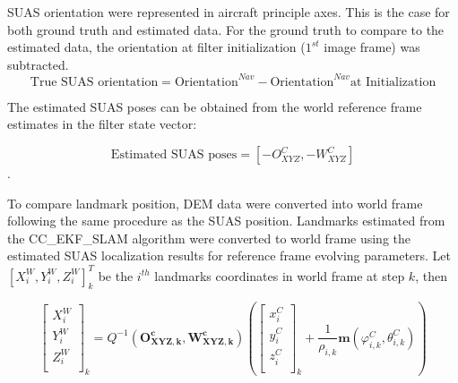 SUAS orientation were represented in aircraft principle axes. This is
the case for both ground truth and estimated data. For the ground
truth to compare to the estimated data, the orientation at filter
initialization ($1^{st}$ image frame) was subtracted. 
$$\text{True SUAS orientation} =
\text{Orientation}^{Nav} - \text{Orientation}^{Nav} \text{at Initialization}$$

The estimated SUAS poses can be obtained from the world reference
frame estimates in the filter state vector:

$$ \text{Estimated SUAS poses} = 
[-O_{XYZ}^{C}, -W_{XYZ}^{C}]$$.


To compare landmark position, DEM data were converted into world frame
following the same procedure as the SUAS position. Landmarks estimated
from the CC\_EKF\_SLAM algorithm were converted to world frame using
the estimated SUAS localization results for reference frame evolving
parameters. Let $[X_i^W,Y_i^W, Z_i^W]^T_k$ be the $i^{th}$ landmarks
coordinates in world frame at step $k$, then

\begin{equation}
  \left[ \begin{array}{c}
    X_{i}^{W}  \\
    Y_{i}^{W}  \\
    Z_{i}^{W}  \\
  \end{array} \right]_k=Q^{-1}(\mathbf{O_{XYZ, k}^{c}}, \mathbf{W_{XYZ,k}^{c}})\left(\left[
    \begin{array}{c}
      x_{i}^{C} \\
      y_{i}^{C} \\
      z_{i}^{C} \\
    \end{array}
  \right]_k+\frac{1}{\rho _{i,k}}\mathbf{m}(\varphi_{i,k}^{C},\theta_{i,k}^{C})\right)
\end{equation}



